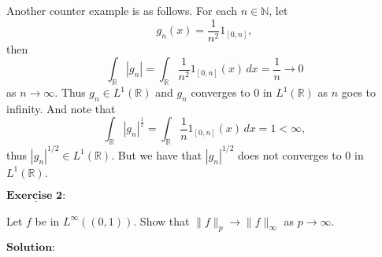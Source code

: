\documentclass[12pt,a4paper]{ctexart}
\begin{document}
Another counter example is as follows. For each $n \in \mathbb N$, let 
$$g_n (x) = \frac{1}{n^2} 1_{[0, n]},$$
then
$$\int_{\mathbb R} |g_n| = \int_{\mathbb R} \frac{1}{n^2} 1_{[0, n]}(x) \, d x = \frac{1}{n} \to 0 $$
as $n \to \infty$. Thus $g_n \in L^1(\mathbb R)$ and $g_n$ converges to $0$ in $L^1(\mathbb R)$ as $n $ goes to infinity. And note that
$$\int_{\mathbb R} |g_n|^{\frac{1}{2}} = \int_{\mathbb R} \frac{1}{n} 1_{[0,n]} (x) \, d x = 1 < \infty,$$
thus $|g_n|^{1/2} \in L^1(\mathbb R)$. But we have that $|g_n|^{1/2} $ does not converges to $0$ in $L^1(\mathbb R)$.
 

\newpage


$\underline{\textbf{Exercise 2:}}$

Let $f$ be in $L^{\infty} ((0, 1))$. Show that $\|f \|_{p} \rightarrow \|f \|_{\infty}$ as $p \rightarrow \infty$.

\vspace{8pt}
$\textbf{Solution:}$
\end{document}
